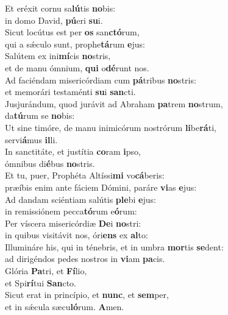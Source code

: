 \evenverse Et eréxit cornu sa\textbf{lú}tis \textbf{no}bis:~\*\\
\evenverse in domo David, \textbf{pú}eri \textbf{su}i.\\
\oddverse Sicut locútus est per \textbf{os} san\textbf{ctó}rum,~\*\\
\oddverse qui a sǽculo sunt, prophe\textbf{tá}rum \textbf{e}jus:\\
\evenverse Salútem ex ini\textbf{mí}cis \textbf{no}stris,~\*\\
\evenverse et de manu ómnium, \textbf{qui} o\textbf{dé}runt nos.\\
\oddverse Ad faciéndam misericórdiam cum \textbf{pá}tribus \textbf{no}stris:~\*\\
\oddverse et memorári testaménti \textbf{su}i \textbf{san}cti.\\
\evenverse Jusjurándum, quod jurávit ad Abraham \textbf{pa}trem \textbf{no}strum,~\*\\
\evenverse da\textbf{tú}rum se \textbf{no}bis:\\
\oddverse Ut sine timóre, de manu inimicórum nostrórum \textbf{li}be\textbf{rá}ti,~\*\\
\oddverse servi\textbf{á}mus \textbf{il}li.\\
\evenverse In sanctitáte, et justítia \textbf{co}ram \textbf{i}pso,~\*\\
\evenverse ómnibus di\textbf{é}bus \textbf{no}stris.\\
\oddverse Et tu, puer, Prophéta Altíssi\textbf{mi} vo\textbf{cá}beris:~\*\\
\oddverse præíbis enim ante fáciem Dómini, paráre \textbf{vi}as \textbf{e}jus:\\
\evenverse Ad dandam sciéntiam salútis \textbf{ple}bi \textbf{e}jus:~\*\\
\evenverse in remissiónem pecca\textbf{tó}rum e\textbf{ó}rum:\\
\oddverse Per víscera misericórdiæ \textbf{De}i \textbf{no}stri:~\*\\
\oddverse in quibus visitávit nos, óri\textbf{ens} ex \textbf{al}to:\\
\evenverse Illumináre his, qui in ténebris, et in umbra \textbf{mor}tis \textbf{se}dent:~\*\\
\evenverse ad dirigéndos pedes nostros in \textbf{vi}am \textbf{pa}cis.\\
\oddverse Glória \textbf{Pa}tri, et \textbf{Fí}lio,~\*\\
\oddverse et Spi\textbf{rí}tui \textbf{San}cto.\\
\evenverse Sicut erat in princípio, et \textbf{nunc}, et \textbf{sem}per,~\*\\
\evenverse et in sǽcula sæcu\textbf{ló}rum. \textbf{A}men.\\
